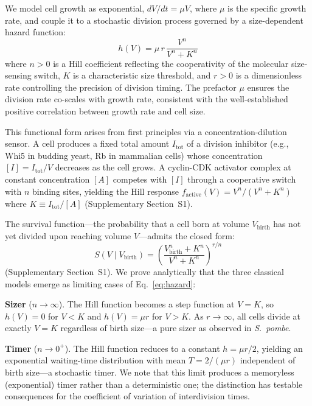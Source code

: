 \documentclass[11pt]{article}
\newcommand{\Vbirth}{V_{\text{birth}}}
\newcommand{\Spombe}{\textit{S.~pombe}}
\begin{document}
We model cell growth as exponential, $dV/dt = \mu V$, where $\mu$ is
the specific growth rate, and couple it to a stochastic division process
governed by a size-dependent hazard function:
\begin{equation}
  h(V) = \mu \, r \, \frac{V^{n}}{V^{n} + K^{n}}
  \label{eq:hazard}
\end{equation}
where $n > 0$ is a Hill coefficient reflecting the cooperativity of
the molecular size-sensing switch, $K$ is a characteristic size
threshold, and $r > 0$ is a dimensionless rate controlling the
precision of division timing.  The prefactor $\mu$ ensures the
division rate co-scales with growth rate, consistent with the
well-established positive correlation between growth rate and cell
size\cite{taheri2015,zheng2020}.

This functional form arises from first principles via a
concentration-dilution sensor.  A cell produces a fixed total amount
$I_{\mathrm{tot}}$ of a division inhibitor (e.g., Whi5 in budding
yeast\cite{schmoller2015}, Rb in mammalian
cells\cite{zatulovskiy2020}) whose concentration
$[I] = I_{\mathrm{tot}}/V$ decreases as the cell grows.  A
cyclin-CDK activator complex at constant concentration $[A]$
competes with $[I]$ through a cooperative switch with $n$ binding
sites, yielding the Hill response $f_{\mathrm{active}}(V) =
V^n/(V^n + K^n)$ where $K \equiv I_{\mathrm{tot}}/[A]$
(Supplementary Section~S1).

The survival function---the probability that a cell born at volume
$\Vbirth$ has not yet divided upon reaching volume $V$---admits the
closed form:
\begin{equation}
  S(V \mid \Vbirth) = \left(\frac{\Vbirth^{n} + K^{n}}{V^{n} + K^{n}}\right)^{r/n}
  \label{eq:survival}
\end{equation}
(Supplementary Section~S1).  We prove analytically that the three
classical models emerge as limiting cases of Eq.~\ref{eq:hazard}:

\textbf{Sizer} ($n \to \infty$).  The Hill function becomes a step
function at $V = K$, so $h(V) = 0$ for $V < K$ and $h(V) = \mu r$
for $V > K$.  As $r \to \infty$, all cells divide at exactly $V = K$
regardless of birth size---a pure sizer as observed in
\Spombe{}\cite{fantes1977,wood2015}.

\textbf{Timer} ($n \to 0^+$).  The Hill function reduces to a
constant $h = \mu r/2$, yielding an exponential waiting-time
distribution with mean $T = 2/(\mu r)$ independent of birth
size---a stochastic timer.  We note that this limit produces a
memoryless (exponential) timer rather than a deterministic one; the
distinction has testable consequences for the coefficient of variation
of interdivision times.
\end{document}
